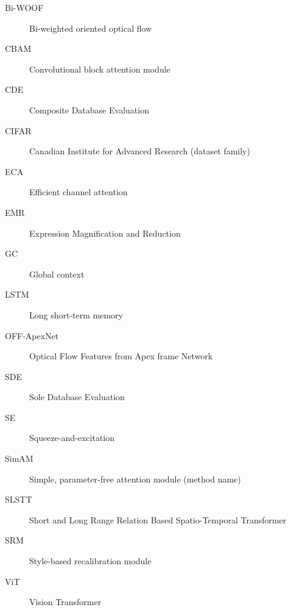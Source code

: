\begin{description}
    \item[Bi-WOOF] Bi-weighted oriented optical flow
    \item[CBAM] Convolutional block attention module
    \item[CDE] Composite Database Evaluation
    \item[CIFAR] Canadian Institute for Advanced Research (dataset family)
    \item[ECA] Efficient channel attention
    \item[EMR] Expression Magnification and Reduction
    \item[GC] Global context
    \item[LSTM] Long short-term memory
    \item[OFF-ApexNet] Optical Flow Features from Apex frame Network
    \item[SDE] Sole Database Evaluation
    \item[SE] Squeeze-and-excitation
    \item[SimAM] Simple, parameter-free attention module (method name)
    \item[SLSTT] Short and Long Range Relation Based Spatio-Temporal Transformer
    \item[SRM] Style-based recalibration module
    \item[ViT] Vision Transformer
\end{description}
